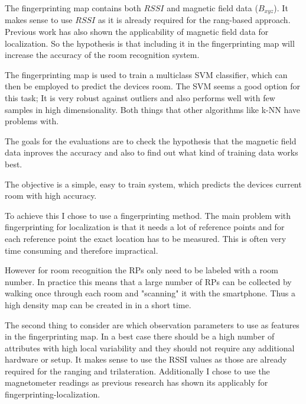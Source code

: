 The fingerprinting map contains both $RSSI$ and magnetic field data ($B_{xyz}$). It makes sense to use $RSSI$ as it is already required for the rang-based approach. Previous work has also shown the applicability of  magnetic field data for localization. So the hypothesis is that including it in the fingerprinting map will increase the accuracy of the room recognition system.

The fingerprinting map is used to train a multiclass SVM classifier, which can then be employed to predict the devices room. The SVM seems a good option for this task; It is very robust against outliers and also performs well with few samples in high dimensionality. Both things that other algorithms like k-NN have problems with.

The goals for the evaluations are to check the hypothesis that the magnetic field data inproves the accuracy and also to find out what kind of training data works best.

The objective is a simple, easy to train system, which predicts the devices current room with high accuracy.

To achieve this I chose to use a fingerprinting method. The main problem with fingerprinting for  localization is that it needs a lot of reference points and for each reference point the exact location has to be measured. This is often very time consuming and therefore impractical.

However for room recognition the RPs only need to be labeled with a room number. In practice this means that a large number of RPs can be collected by walking once through each room and "scanning" it with the smartphone. Thus a high density map can be created in in a short time.

The second thing to consider are which observation parameters to use as features in the fingerprinting map. In a best case there should be a high number of attributes with high local variability and they should not require any additional hardware or setup. It makes sense to use the RSSI values as those are already required for the ranging and trilateration. Additionally I chose to use the magnetometer readings as previous research has shown its applicably for fingerprinting-localization.



